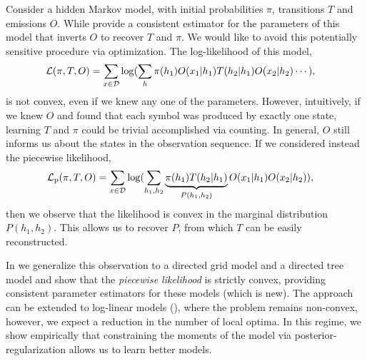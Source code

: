 Consider a hidden Markov model, with initial probabilities $\pi$,
  transitions $T$ and emissions $O$. 
While \citet{hsu09spectral,anandkumar12moments} provide a consistent estimator
  for the parameters of this model that inverts $O$ to recover $T$ and
  $\pi$. We would like to avoid this potentially sensitive procedure via optimization.
The log-likelihood of this model, 
  \begin{align}
    \mathcal{L}(\pi, T, O) &= \sum_{x\in\mathcal{D}} \log( \sum_{h} \pi(h_1) O(x_1 | h_1) T(h_2 | h_1) O(x_2 | h_2) \cdots ),
  \end{align}
  is not convex, even if we knew any one of the parameters.
However, intuitively, if we knew $O$ and found that each symbol was
  produced by exactly one state, learning $T$ and $\pi$ could be trivial
  accomplished via counting. 
In general, $O$ still informs us about the states in the observation
  sequence. If we considered instead the piecewise likelihood, 
  \begin{align}
    \mathcal{L}_{\textrm{p}}(\pi, T, O) &= \sum_{x\in\mathcal{D}} \log( \sum_{h_1, h_2} \underbrace{\pi(h_1) T(h_2 | h_1)}_{P(h_1,h_2)} O(x_1 | h_1) O(x_2 | h_2) ),
  \end{align}
  then we observe that the likelihood is convex in the marginal
  distribution $P(h_1,h_2)$. This allows us to recover $P$, from which $T$
  can be easily reconstructed.

In  we generalize this observation to a directed grid
  model and a directed tree model and show that the {\em piecewise
  likelihood} is strictly convex, providing consistent parameter
  estimators for these models (which is new)\reword.
The approach can be extended to log-linear
  models (), where the problem remains non-convex,
  however, we expect a reduction in the number of local optima. 
In this regime, we show empirically that constraining the moments of the
  model via posterior-regularization allows us to learn better models.

